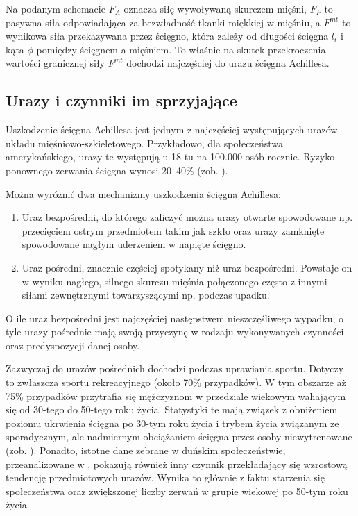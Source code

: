 Na podanym schemacie $F_A$ oznacza siłę wywoływaną skurczem mięśni, $F_P$ to pasywna siła odpowiadająca za bezwładność tkanki miękkiej w mięśniu, a $F^{mt}$ to wynikowa siła przekazywana przez ścięgno, która zależy od długości ścięgna $l_t$ i kąta $\phi$ pomiędzy ścięgnem a mięśniem. To właśnie na skutek przekroczenia wartości granicznej siły $F^{mt}$ dochodzi najczęściej do urazu ścięgna Achillesa. 

\subsection{Urazy i czynniki im sprzyjające}

Uszkodzenie ścięgna Achillesa jest jednym z najczęściej występujących urazów układu mięśniowo-szkieletowego. Przykładowo, dla społeczeństwa amerykańskiego, urazy te występują u 18-tu na 100.000 osób rocznie. Ryzyko ponownego zerwania ścięgna wynosi 20--40\% (zob. \cite{EpidemiologyUS}). 

Można wyróżnić dwa mechanizmy uszkodzenia ścięgna Achillesa: 
\begin{enumerate}
	\item Uraz bezpośredni, do którego zaliczyć można urazy otwarte spowodowane np. przecięciem ostrym przedmiotem takim jak szkło oraz urazy zamknięte spowodowane nagłym uderzeniem w napięte ścięgno.
	\item Uraz pośredni, znacznie częściej spotykany niż uraz bezpośredni. Powstaje on w wyniku nagłego, silnego skurczu mięśnia połączonego często z innymi siłami zewnętrznymi towarzyszącymi np. podczas upadku.
\end{enumerate}
O ile uraz bezpośredni jest najczęściej następstwem nieszczęśliwego wypadku, o tyle urazy pośrednie mają swoją przyczynę w rodzaju wykonywanych czynności oraz predyspozycji danej osoby. 

Zazwyczaj do urazów pośrednich dochodzi podczas uprawiania sportu. Dotyczy to zwłaszcza sportu rekreacyjnego (około 70\% przypadków). W tym obszarze aż 75\% przypadków przytrafia się mężczyznom w przedziale wiekowym wahającym się od 30-tego do 50-tego roku życia. Statystyki te mają związek z obniżeniem poziomu ukrwienia ścięgna po 30-tym roku życia i trybem życia związanym ze sporadycznym, ale nadmiernym obciążaniem ścięgna przez osoby niewytrenowane (zob. \cite{Etiologia}). Ponadto, istotne dane zebrane w duńskim społeczeństwie, przeanalizowane w \cite{Ganestam2015}, pokazują również inny czynnik przekładający się wzrostową tendencję przedmiotowych urazów. Wynika to głównie z faktu starzenia się społeczeństwa oraz zwiększonej liczby zerwań w grupie wiekowej po 50-tym roku życia. 

